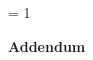 \ifnum\isPayant = 1
\myPageBreak
\begin{footnotesize}
    \textbf{\large Addendum}
    \begin{itemize}[label = {}]
        \noteslist
    \end{itemize}    
\end{footnotesize}
\fi

\vfill
